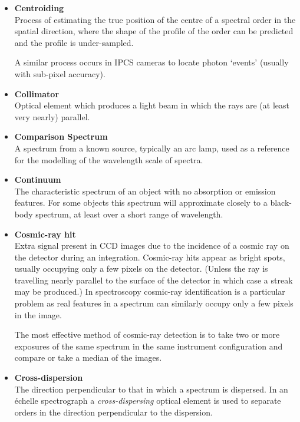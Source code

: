 \documentclass[twoside,11pt]{article}
\newcommand{\htmlref}[2]{#1}
\begin{document}
\begin{itemize}
\item {\bf\label{gl_centroiding}Centroiding}\\
      Process of estimating the true position of the centre of a spectral
      order in the spatial direction, where the shape of the profile of
      the order can be predicted and the profile is under-sampled.

      A similar process occurs in \htmlref{IPCS}{gl_ipcs} cameras to locate
      photon `events' (usually with sub-pixel accuracy).

\item {\bf\label{gl_collimator}Collimator}\\
      Optical element which produces a light beam in which the rays
      are (at least very nearly) parallel.

\item {\bf\label{gl_comparison}Comparison Spectrum}\\
      A spectrum from a known source, typically an \htmlref{arc lamp}{gl_arc},
      used as a reference for the modelling of the
      \htmlref{wavelength scale}{gl_wavelength} of spectra.

\item {\bf\label{gl_continuum}Continuum}\\
      The characteristic spectrum of an object with no absorption or
      emission features.  For some objects this spectrum will approximate
      closely to a black-body spectrum, at least over a short range of
      wavelength.

\item {\bf\label{gl_cosmic_ray}Cosmic-ray hit}\\
      Extra signal present in CCD images due to the incidence of a cosmic
      ray on the detector during an integration.  Cosmic-ray hits appear
      as bright spots, usually occupying only a few pixels on the detector.
      (Unless the ray is travelling nearly parallel to the surface of the
      detector in which case a streak may be produced.)
      In spectroscopy cosmic-ray identification is a particular problem
      as real features in a spectrum can similarly occupy only a few pixels
      in the image.

      The most effective method of cosmic-ray detection is to take
      two or more exposures of the same spectrum in the same instrument
      configuration and compare or take a median of the images.

\item {\bf\label{gl_cross_dispersion}Cross-dispersion}\\
      The direction perpendicular to that in which a spectrum is
      dispersed.  In an \'{e}chelle spectrograph a {\sl cross-dispersing}
      optical element is used to separate orders in the
      direction perpendicular to the dispersion.


\end{itemize}
\end{document}
